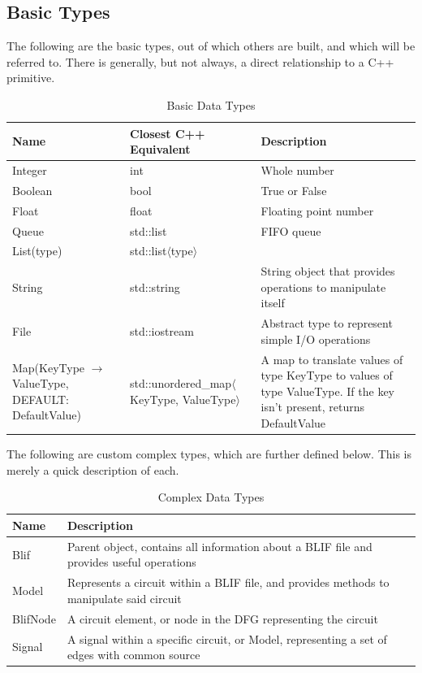 \documentclass[12pt,final,oneside]{dwThesis} %
\begin{document}
   \subsection{Basic Types}
   The following are the basic types, out of which others are built, and which will be referred to. There is generally, but not always, a direct relationship to a C++ primitive.
   \begin{table}
      \begin{tabularx}{\linewidth}{XXX}
         \toprule
         Name & Closest C++ Equivalent & Description\\
         \midrule
         Integer &  int & Whole number \\
         Boolean &  bool & True or False \\
         Float & float & Floating point number \\
         Queue & std::list & FIFO queue \\
         List(type) & std::list$\langle$type$\rangle$ & \\
         String & std::string & String object that provides operations to manipulate itself \\
         File & std::iostream & Abstract type to represent simple I/O operations \\
         Map(KeyType $\to$ ValueType, DEFAULT:  DefaultValue) & std::unordered\_map$\langle$KeyType, ValueType$\rangle$ &  A map to translate values of type KeyType to values of type ValueType. If the key isn't present, returns DefaultValue \\
         \bottomrule
      \end{tabularx}
      \caption{Basic Data Types}
   \end{table}
   The following are custom complex types, which are further defined below. This is merely a quick description of each.
   \begin{table}
      \begin{tabularx}{\linewidth}{lX}
         \toprule
         Name & Description\\
         \midrule
         Blif & Parent object, contains all information about a \ac{BLIF} file and provides useful operations \\
         Model & Represents a circuit within a \ac{BLIF} file, and provides methods to manipulate said circuit \\
         BlifNode & A circuit element, or node in the \ac{DFG} representing the circuit \\
         Signal & A signal within a specific circuit, or Model, representing a set of edges with common source \\
         \bottomrule
      \end{tabularx}
      \caption{Complex Data Types}
   \end{table}
\end{document}
